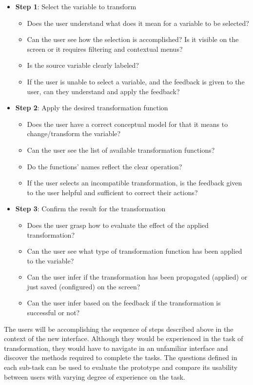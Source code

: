 \documentclass[12pt,letterpaper]{article}
\begin{document}
\begin{itemize}
    \item \textbf{Step 1}: Select the variable to transform
    \begin{itemize}
        \item Does the user understand what does it mean for a variable to be selected?
        \item Can the user see how the selection is accomplished? Is it visible on the screen or it requires filtering and contextual menus?
        \item Is the source variable clearly labeled?
        \item If the user is unable to select a variable, and the feedback is given to the user, can they understand and apply the feedback? 
    \end{itemize}
    \item \textbf{Step 2}: Apply the desired transformation function
    \begin{itemize}
        \item Does the user have a correct conceptual model for that it means to change/transform the variable?
        \item Can the user see the list of available transformation functions?
        \item Do the functions' names reflect the clear operation? 
        \item If the user selects an incompatible transformation, is the feedback given to the user helpful and sufficient to correct their actions?
    \end{itemize}
    \item \textbf{Step 3}: Confirm the result for the transformation
    \begin{itemize}
        \item Does the user grasp how to evaluate the effect of the applied transformation?
        \item Can the user see what type of transformation function has been applied to the variable?
        \item Can the user infer if the transformation has been propagated (applied) or just saved (configured) on the screen?
        \item Can the user infer based on the feedback if the transformation is successful or not?
    \end{itemize}
\end{itemize}

The users will be accomplishing the sequence of steps described above in the context of the new interface. Although they would be experienced in the task of transformation, they would have to navigate in an unfamiliar interface and discover the methods required to complete the tasks. The questions defined in each sub-task can be used to evaluate the prototype and compare its usability between users with varying degree of experience on the task. 
\end{document}
